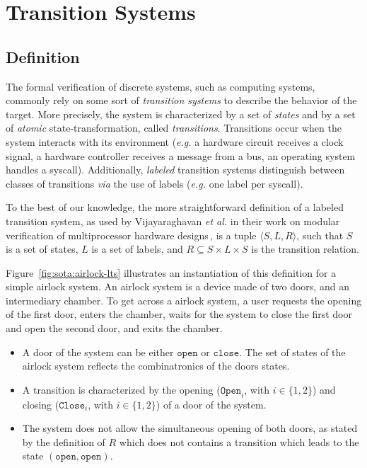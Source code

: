 \section{Transition Systems}
\label{sec:sota:formalisms}

\subsection{Definition}

The formal verification of discrete systems, such as computing systems, commonly
rely on some sort of \emph{transition systems} to describe the behavior of the
target.
%
More precisely, the system is characterized by a set of \emph{states} and by a
set of \emph{atomic} state-transformation, called \emph{transitions}.
%
Transitions occur when the system interacts with its environment (\emph{e.g.} a
hardware circuit receives a clock signal, a hardware controller receives a
message from a bus, an operating system handles a syscall).
%
Additionally, \emph{labeled} transition systems distinguish between classes of
transitions \emph{via} the use of labels (\emph{e.g.} one label per syscall).

To the best of our knowledge, the more straightforward definition of a labeled
transition system, as used by Vijayaraghavan \emph{et al.} in their work on
modular verification of multiprocessor hardware
designs\,\cite{vijayaraghavan2015modular}, is a tuple
\( \langle S, L, R \rangle \), such that \( S \) is a set of states, \( L \) is
a set of labels, and \( R \subseteq S \times L \times S \) is the transition
relation.

\begin{example}
  Figure~\ref{fig:sota:airlock-lts} illustrates an instantiation of this
  definition for a simple airlock system.
  An airlock system is a device made of two doors, and an intermediary chamber.
  To get across a airlock system, a user requests the opening of the first door,
  enters the chamber, waits for the system to close the first door and open the
  second door, and exits the chamber.

  \begin{itemize}
  \item A door of the system can be either \( \mathtt{open} \) or
    \( \mathtt{close} \).
    The set of states of the airlock system reflects the combinatronics of the
    doors states.
  \item A transition is characterized by the opening (\( \mathtt{Open}_i\), with
    \( i \in \{1, 2\} \)) and closing (\( \mathtt{Close}_i \), with
    \( i \in \{1, 2\} \)) of a door of the system.
  \item The system does not allow the simultaneous opening of both doors, as
    stated by the definition of \( R \) which does not contains a transition
    which leads to the state \( (\mathtt{open}, \mathtt{open}) \).
  \end{itemize}
\end{example}

